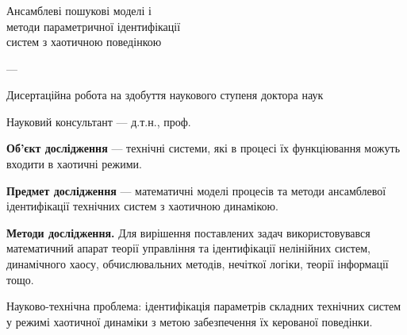 \documentclass[14pt,handout,utf8]{beamer}
\author{\dissauthorUa}
\title[~]{\booknameUa}
\begin{document}
\begin{frame}
  \frametitle{}
  \begin{center}
    {\Large Ансамблеві пошукові моделі і \\ методи параметричної ідентифікації \\ систем з хаотичною поведінкою}

    \vfill

    {\dissSpecId --- \dissSpecUa}

    \vfill

    {\large \dissauthorMain}

    \vfill

    {Дисертаційна робота на здобуття наукового ступеня доктора наук}

    \vfill

    Науковий консультант --- д.т.н., проф. \superUa



  \end{center}

  \vfill

\textbf{Об'єкт дослідження } ---
технічні системи, які в процесі їх функціювання можуть
входити в хаотичні режими.

\smallskip
\textbf{Предмет дослідження } ---
математичні моделі процесів та методи
ансамблевої ідентифікації технічних систем з хаотичною динамікою.

\smallskip
\textbf{Методи дослідження.}
Для вирішення поставлених задач використовувався математичний апарат
теорії управління та ідентифікації нелінійних систем, динамічного хаосу,
обчислювальних методів, нечіткої логіки, теорії інформації тощо.

\smallskip
Науково-технічна проблема: ідентифікація параметрів складних технічних
систем у режимі хаотичної динаміки
з метою забезпечення їх керованої поведінки.
\end{frame}

\end{document}
